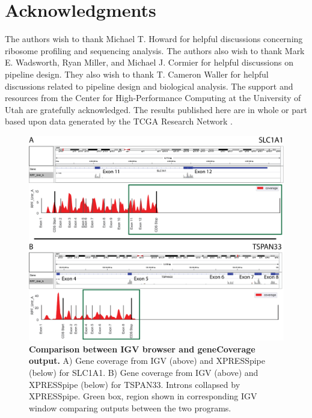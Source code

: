 \documentclass[10pt, oneside]{article}
\newcommand{\beginsupplement}{%
  \setcounter{table}{0}
  \renewcommand{\thetable}{S\arabic{table}}%
  \setcounter{figure}{0}
  \renewcommand{\thefigure}{S\arabic{figure}}%
}
\begin{document}
\section*{Acknowledgments}
The authors wish to thank Michael T. Howard for helpful discussions concerning ribosome profiling and sequencing analysis. The authors also wish to thank Mark E. Wadsworth, Ryan Miller, and Michael J. Cormier for helpful discussions on pipeline design. They also wish to thank T. Cameron Waller for helpful discussions related to pipeline design and biological analysis. The support and resources from the Center for High-Performance Computing at the University of Utah are gratefully acknowledged. The results published here are in whole or part based upon data generated by the TCGA Research Network \cite{tcga}.\\




\newpage
\beginsupplement

\begin{figure}
\centering
  \includegraphics[width=160mm]{figures/xpresspipe_supplement1.png}
  \caption{\textbf{Comparison between IGV browser and geneCoverage output.} A) Gene coverage from IGV (above) and XPRESSpipe (below) for SLC1A1. B) Gene coverage from IGV (above) and XPRESSpipe (below) for TSPAN33. Introns collapsed by XPRESSpipe. Green box, region shown in corresponding IGV window comparing outputs between the two programs.}
  \label{fig:supplement1}
\end{figure}
\end{document}
